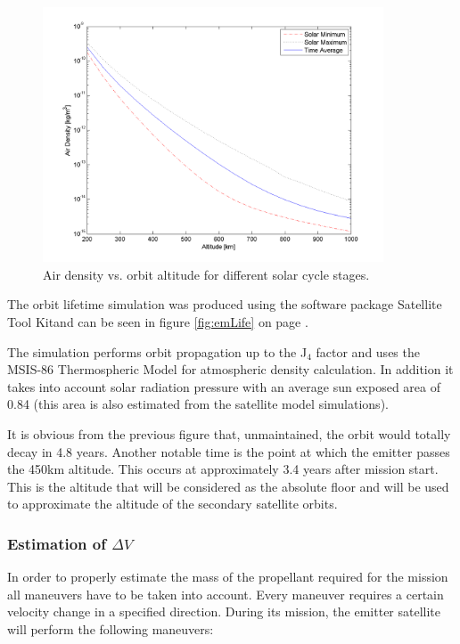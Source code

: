 \begin{figure}[ht!]
\centering
\includegraphics[width=0.9\textwidth, angle=0]{chapters/img/densityAltitude.png}
\caption{Air density vs. orbit altitude for different solar cycle stages.}
\label{fig:densityProfile}
\end{figure}

The orbit lifetime simulation was produced using the software package Satellite Tool Kit\texttrademark and can be seen in figure \ref{fig:emLife} on page \pageref{fig:emLife}.

The simulation performs orbit propagation up to the J$_4$ factor and uses the MSIS-86 Thermospheric Model for atmospheric density calculation. In addition it takes into account solar radiation pressure with an average sun exposed area of 0.84 (this area is also estimated from the satellite model simulations).

It is obvious from the previous figure that, unmaintained, the orbit would totally decay in 4.8 years. Another notable time is the point at which the emitter passes the 450km altitude. This occurs at approximately 3.4 years after mission start. This is the altitude that will be considered as the absolute floor and will be used to approximate the altitude of the secondary satellite orbits.


\subsubsection{Estimation of $\Delta V$}
\label{frEmDV}

In order to properly estimate the mass of the propellant required for the mission all maneuvers have to be taken into account. Every maneuver requires a certain velocity change in a specified direction. During its mission, the emitter satellite will perform the following maneuvers:

